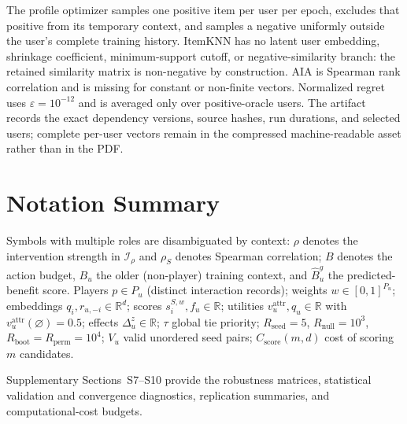 \documentclass[manuscript,screen,review,anonymous]{acmart}
\begin{document}
The profile optimizer samples one positive item per user per epoch, excludes that positive from its temporary context, and samples a negative uniformly outside the user's complete training history. ItemKNN has no latent user embedding, shrinkage coefficient, minimum-support cutoff, or negative-similarity branch: the retained similarity matrix is non-negative by construction. AIA is Spearman rank correlation and is missing for constant or non-finite vectors. Normalized regret uses $\varepsilon=10^{-12}$ and is averaged only over positive-oracle users. The artifact records the exact dependency versions, source hashes, run durations, and selected users; complete per-user vectors remain in the compressed machine-readable asset rather than in the PDF.

\section{Notation Summary}\label{app:notation}
Symbols with multiple roles are disambiguated by context: $\rho$ denotes the intervention strength in $\mathcal I_\rho$ and $\rho_S$ denotes Spearman correlation; $B$ denotes the action budget, $B_u$ the older (non-player) training context, and $\widehat B_u^g$ the predicted-benefit score. Players $p\in P_u$ (distinct interaction records); weights $w\in[0,1]^{P_u}$; embeddings $q_i,r_{u,-i}\in\mathbb R^d$; scores $s_i^{S,w},f_u\in\mathbb R$; utilities $v_u^{\mathrm{attr}},q_u\in\mathbb R$ with $v_u^{\mathrm{attr}}(\varnothing)=0.5$; effects $\Delta_u^z\in\mathbb R$; $\tau$ global tie priority; $R_{\mathrm{seed}}=5$, $R_{\mathrm{null}}=10^3$, $R_{\mathrm{boot}}=R_{\mathrm{perm}}=10^4$; $V_u$ valid unordered seed pairs; $C_{\mathrm{score}}(m,d)$ cost of scoring $m$ candidates.

Supplementary Sections~S7--S10 provide the robustness matrices, statistical validation and convergence diagnostics, replication summaries, and computational-cost budgets.
\end{document}
